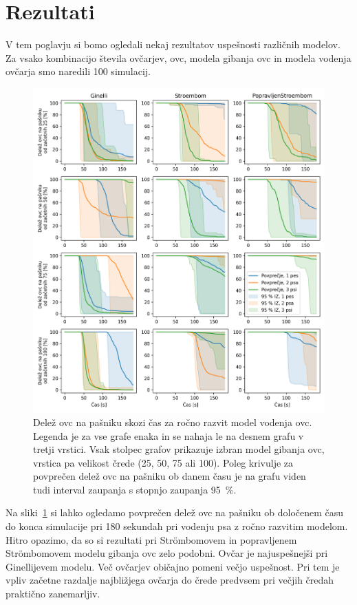 \section{Rezultati}

V tem poglavju si bomo ogledali nekaj rezultatov uspešnosti različnih modelov. Za vsako kombinacijo števila ovčarjev, ovc, modela gibanja ovc in modela vodenja ovčarja smo naredili 100 simulacij.

\begin{figure}[H]  %
	\centering
	\includegraphics[width=\textwidth]{../poglavja/grafi/prezivetvena-Voronoi.png}
	\caption[Delež ovc na pašniku skozi čas]{Delež ovc na pašniku skozi čas za ročno razvit model vodenja ovc. Legenda je za vse grafe enaka in se nahaja le na desnem grafu v tretji vrstici. Vsak stolpec grafov prikazuje izbran model gibanja ovc, vrstica pa velikost črede (25, 50, 75 ali 100). Poleg krivulje za povprečen delež ovc na pašniku ob danem času je na grafu viden tudi interval zaupanja s stopnjo zaupanja 95~\%.} %
	\label{fig:prezivetvena}
\end{figure}

Na sliki~\ref{fig:prezivetvena} si lahko ogledamo povprečen delež ovc na pašniku ob določenem času do konca simulacije pri 180 sekundah pri vodenju psa z ročno razvitim modelom. Hitro opazimo, da so si rezultati pri Str{\"o}mbomovem in popravljenem Str{\"o}mbomovem modelu gibanja ovc zelo podobni. Ovčar je najuspešnejši pri Ginellijevem modelu. Več ovčarjev običajno pomeni večjo uspešnost. Pri tem je vpliv začetne razdalje najbližjega ovčarja do črede predvsem pri večjih čredah praktično zanemarljiv.

